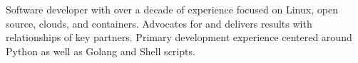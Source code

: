 


\begin{cvparagraph}

Software developer with over a decade of experience focused on Linux, open
source, clouds, and containers. Advocates for and delivers results with
relationships of key partners. Primary development experience centered around
Python as well as Golang and Shell scripts.

\end{cvparagraph}
